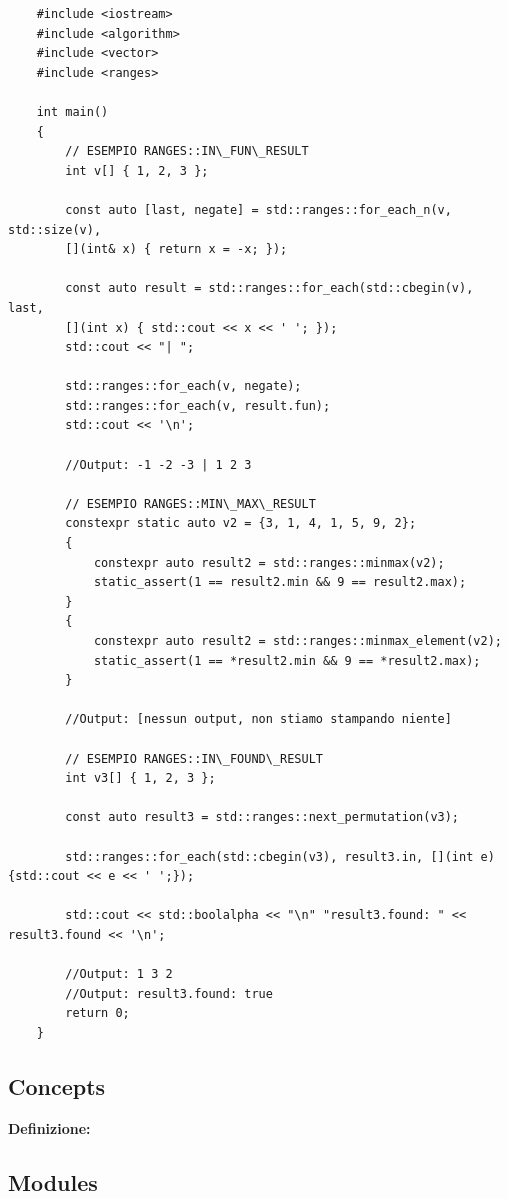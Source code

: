 \begin{lstlisting}
	#include <iostream>
	#include <algorithm>
	#include <vector>
	#include <ranges>
	
	int main()
	{
		// ESEMPIO RANGES::IN\_FUN\_RESULT
		int v[] { 1, 2, 3 };
		
		const auto [last, negate] = std::ranges::for_each_n(v, std::size(v),
		[](int& x) { return x = -x; });
		
		const auto result = std::ranges::for_each(std::cbegin(v), last,
		[](int x) { std::cout << x << ' '; });
		std::cout << "| ";
		
		std::ranges::for_each(v, negate);
		std::ranges::for_each(v, result.fun);
		std::cout << '\n';
		
		//Output: -1 -2 -3 | 1 2 3
		
		// ESEMPIO RANGES::MIN\_MAX\_RESULT
		constexpr static auto v2 = {3, 1, 4, 1, 5, 9, 2};
		{
			constexpr auto result2 = std::ranges::minmax(v2);
			static_assert(1 == result2.min && 9 == result2.max);
		}
		{
			constexpr auto result2 = std::ranges::minmax_element(v2);
			static_assert(1 == *result2.min && 9 == *result2.max);
		}
		
		//Output: [nessun output, non stiamo stampando niente]
		
		// ESEMPIO RANGES::IN\_FOUND\_RESULT
		int v3[] { 1, 2, 3 };
		
		const auto result3 = std::ranges::next_permutation(v3);
		
		std::ranges::for_each(std::cbegin(v3), result3.in, [](int e){std::cout << e << ' ';});
		
		std::cout << std::boolalpha << "\n" "result3.found: " << result3.found << '\n';
		
		//Output: 1 3 2 
		//Output: result3.found: true
		return 0;
	}
\end{lstlisting}

\newpage

\subsection{Concepts}


\textsf{\small \textbf{Definizione: } } \\

\newpage

\subsection{Modules}


